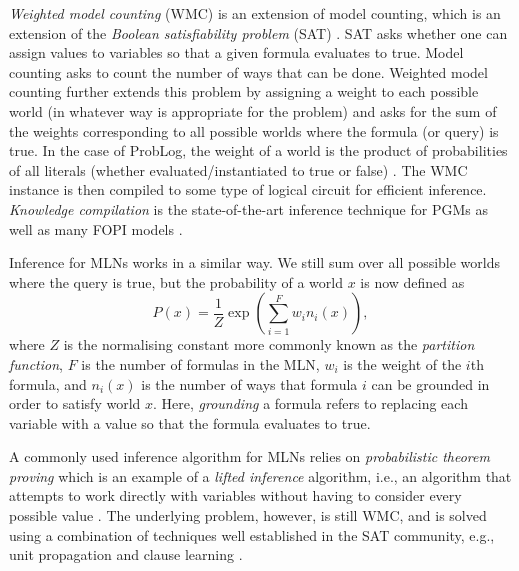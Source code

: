 \documentclass[11pt,english,twocolumn]{article}
\begin{document}
\emph{Weighted model counting} (WMC) is an extension of model counting, which is
an extension of the \emph{Boolean satisfiability problem} (SAT)
\cite{DBLP:journals/ai/ChaviraD08}. SAT asks whether one can assign values to
variables so that a given formula evaluates to true. Model counting asks to
count the number of ways that can be done. Weighted model counting further
extends this problem by assigning a weight to each possible world (in whatever
way is appropriate for the problem) and asks for the sum of the weights
corresponding to all possible worlds where the formula (or query) is true. In
the case of ProbLog, the weight of a world is the product of probabilities of
all literals (whether evaluated/instantiated to true or false)
\cite{DBLP:series/synthesis/2016Raedt}. The WMC instance is then compiled to
some type of logical circuit for efficient inference. \emph{Knowledge
  compilation} \cite{DBLP:conf/ijcai/BroeckTMDR11} is the state-of-the-art
inference technique for PGMs as well as many FOPI models
\cite{DBLP:series/synthesis/2016Raedt}.

Inference for MLNs works in a similar way. We still sum over all possible
worlds where the query is true, but the probability of a world $x$ is now
defined as
\[
  P(x) = \frac{1}{Z} \exp \left( \sum_{i=1}^F w_i n_i(x) \right),
\]
where $Z$ is the normalising constant more commonly known as the \emph{partition
function}, $F$ is the number of formulas in the MLN, $w_i$ is the weight of the
$i$th formula, and $n_i(x)$ is the number of ways that formula $i$ can be
grounded in order to satisfy world $x$. Here, \emph{grounding} a formula refers
to replacing each variable with a value so that the formula evaluates to true.

A commonly used inference algorithm for MLNs relies on \emph{probabilistic
  theorem proving}
\cite{DBLP:journals/cacm/GogateD16,DBLP:journals/cib/Venugopal17}
which is an example of a \emph{lifted inference} algorithm, i.e., an algorithm
that attempts to work directly with variables without having to consider every
possible value \cite{DBLP:conf/ijcai/Poole03}. The underlying problem, however,
is still WMC, and is solved using a combination of techniques well established
in the SAT community, e.g., unit propagation and clause learning
\cite{DBLP:journals/cib/Venugopal17}.

\end{document}
